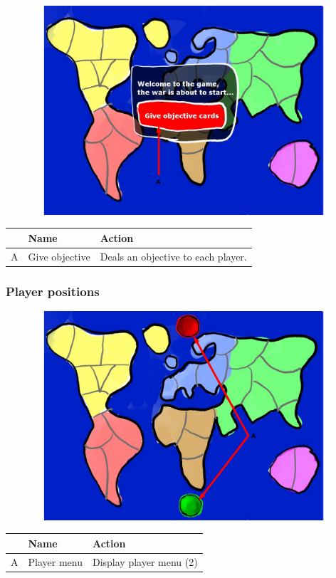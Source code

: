 \documentclass[12pt,a4paper]{article}
\begin{document}
\begin{figure}[H]
  \centering
  \includegraphics[width=11cm]{pic/mocks/3-1.pdf}
\end{figure}

\begin{table}[H]
\small
\centering
\begin{tabular}{c|p{5cm}|p{7cm}}
& Name & Action \\ \hline\hline
A
&Give objective
&Deals an objective to each player.
\end{tabular}
\end{table}


\subsubsection{Player positions}

\begin{figure}[H]
  \centering
  \includegraphics[width=11cm]{pic/mocks/3-2.pdf}
\end{figure}

\begin{table}[H]
\small
\centering
\begin{tabular}{c|p{5cm}|p{7cm}}
& Name & Action \\ \hline\hline
A
&Player menu
&Display player menu (2)
\end{tabular}
\end{table}
\end{document}
